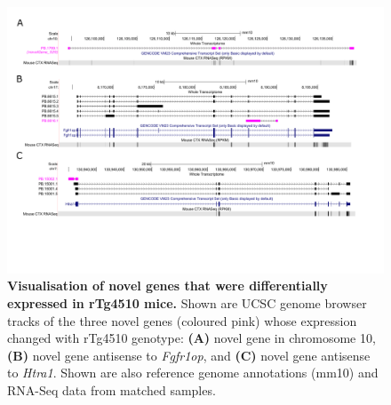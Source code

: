 \begin{landscape}
	\begin{figure}[!htp]
		\centering
		\includegraphics[page=1,trim={0 3.5cm 0 1cm}, scale = 0.80]{Figures/TracksFigures_Diff.pdf}
		\captionsetup{width=1.4\textwidth}
		\caption[Visualisation of differentially expressed novel genes in rTg4510 TG mice]%
		{\textbf{Visualisation of novel genes that were differentially expressed in rTg4510 mice.} Shown are UCSC genome browser tracks of the three novel genes (coloured pink) whose expression changed with rTg4510 genotype: \textbf{(A)} novel gene in chromosome 10, \textbf{(B)} novel gene antisense to \textit{Fgfr1op}, and \textbf{(C)} novel gene antisense to \textit{Htra1}. Shown are also reference genome annotations (mm10) and RNA-Seq data from matched samples.}   
		\label{fig:whole_novelgene_difftracks}
	\end{figure}
\end{landscape}

